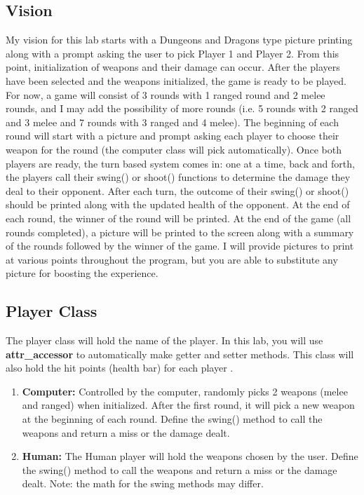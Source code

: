 \documentclass{article}
\begin{document}
\subsection*{Vision}
My vision for this lab starts with a Dungeons and Dragons type picture printing along with a prompt asking the user to pick Player 1 and Player 2. From this point, initialization of weapons and their damage can occur. After the players have been selected and the weapons initialized, the game is ready to be played. For now, a game will consist of 3 rounds with 1 ranged round and 2 melee rounds, and I may add the possibility of more rounds (i.e. 5 rounds with 2 ranged and 3 melee and 7 rounds with 3 ranged and 4 melee). The beginning of each round will start with a picture and prompt asking each player to choose their weapon for the round (the computer class will pick automatically). Once both players are ready, the turn based system comes in: one at a time, back and forth, the players call their swing() or shoot() functions to determine the damage they deal to their opponent. After each turn, the outcome of their swing() or shoot() should be printed along with the updated health of the opponent. At the end of each round, the winner of the round will be printed. At the end of the game (all rounds completed), a picture will be printed to the screen along with a summary of the rounds followed by the winner of the game. I will provide pictures to print at various points throughout the program, but you are able to substitute any picture for boosting the experience.  

\subsection*{Player Class}
The player class will hold the name of the player. In this lab, you will use \textbf{attr\_accessor} to automatically make getter and setter methods. This class will also hold the hit points (health bar) for each player \cite{code:blog}.
\begin{enumerate}

\item \textbf{Computer:} Controlled by the computer, randomly picks 2 weapons (melee and ranged) when initialized. After the first round, it will pick a new weapon at the beginning of each round. Define the swing() method to call the weapons and return a miss or the damage dealt. 

\item \textbf{Human:} The Human player will hold the weapons chosen by the user. Define the swing() method to call the weapons and return a miss or the damage dealt. Note: the math for the swing methods may differ.

\end{enumerate}
\end{document}
